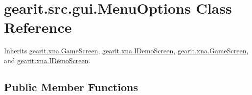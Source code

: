 \hypertarget{classgearit_1_1src_1_1gui_1_1_menu_options}{\section{gearit.\+src.\+gui.\+Menu\+Options Class Reference}
\label{classgearit_1_1src_1_1gui_1_1_menu_options}
}


Inherits \hyperlink{classgearit_1_1xna_1_1_game_screen}{gearit.\+xna.\+Game\+Screen}, \hyperlink{interfacegearit_1_1xna_1_1_i_demo_screen}{gearit.\+xna.\+I\+Demo\+Screen}, \hyperlink{classgearit_1_1xna_1_1_game_screen}{gearit.\+xna.\+Game\+Screen}, and \hyperlink{interfacegearit_1_1xna_1_1_i_demo_screen}{gearit.\+xna.\+I\+Demo\+Screen}.

\subsection*{Public Member Functions}
